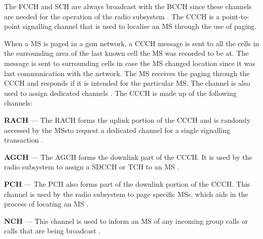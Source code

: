 The \gls{FCCH} and \gls{SCH} are always broadcast with the \gls{BCCH} since these channels are needed for the operation of the radio subsystem \cite{GSMArchitectureProtocolsServices}. The \gls{CCCH} is a point-to-point signalling channel that is used to localise an \gls{MS} through the use of paging\cite{GSMArchitectureProtocolsServices}. 

When a \gls{MS} is paged in a \gls{gsm} network, a \gls{CCCH} message is sent to all the cells in the surrounding area of the last known cell the \gls{MS} was recorded to be at\cite{GSMArchitectureProtocolsServices}. The message is sent to surrounding cells in case the \gls{MS} changed location since it was last communication with the network\cite{GSMArchitectureProtocolsServices}. The \gls{MS} receives the paging through the \gls{CCCH} and responds if it is intended for the particular MS\cite{GSMArchitectureProtocolsServices}. The channel is also used to assign dedicated channels \cite{GSMArchitectureProtocolsServices}. The \gls{CCCH} is made up of the following channels:
\begin{description}
  \item{\textbf{\Gls{RACH}}} --- The \gls{RACH} forms the uplink portion of the \gls{CCCH} and is randomly accessed by the \glspl{MS}to request a dedicated channel for a single signalling transaction \cite{GSMArchitectureProtocolsServices}.
  \item{\textbf{\Gls{AGCH}}} --- The \gls{AGCH} forms the downlink part of the \gls{CCCH}\@. It is used by the radio subsystem to assign a \gls{SDCCH} or \gls{TCH} to an \gls{MS} \cite{GSMArchitectureProtocolsServices}.
  \item{\textbf{\Gls{PCH}}} --- The \gls{PCH} also forms part of the downlink portion of the \gls{CCCH}\@. This channel is used by the radio subsystem to page specific \glspl{MS}, which aids in the process of locating an \gls{MS} \cite{GSMArchitectureProtocolsServices}.
\item{\textbf{\Gls{NCH}}} --- This channel is used to inform an \gls{MS} of any incoming group calls or calls that are being broadcast \cite{GSMArchitectureProtocolsServices}.
\end{description}


